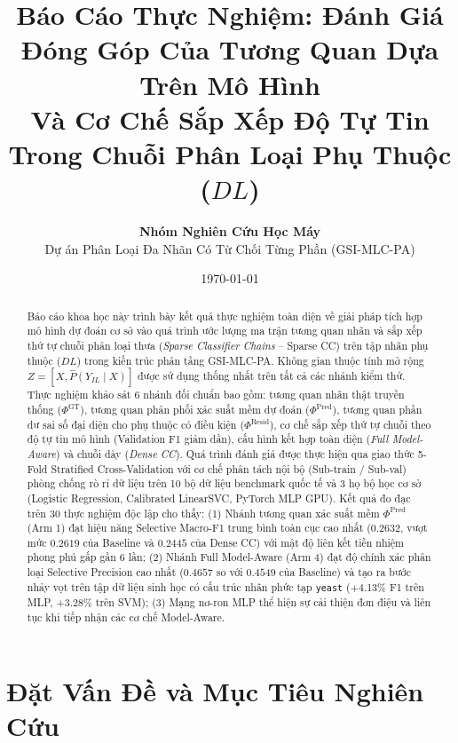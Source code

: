 \documentclass[11pt,a4paper]{article}
\begin{document}
\title{\textbf{\Large Báo Cáo Thực Nghiệm: Đánh Giá Đóng Góp Của Tương Quan Dựa Trên Mô Hình\\ Và Cơ Chế Sắp Xếp Độ Tự Tin Trong Chuỗi Phân Loại Phụ Thuộc ($DL$)}}
\author{\textbf{Nhóm Nghiên Cứu Học Máy} \\ Dự án Phân Loại Đa Nhãn Có Từ Chối Từng Phần (GSI-MLC-PA)}
\date{\today}
\maketitle

\begin{abstract}
Báo cáo khoa học này trình bày kết quả thực nghiệm toàn diện về giải pháp tích hợp mô hình dự đoán cơ sở vào quá trình ước lượng ma trận tương quan nhãn và sắp xếp thứ tự chuỗi phân loại thưa (\textit{Sparse Classifier Chains} -- Sparse CC) trên tập nhãn phụ thuộc ($DL$) trong kiến trúc phân tầng GSI-MLC-PA. Không gian thuộc tính mở rộng $Z = [X, \hat{P}(Y_{IL} \mid X)]$ được sử dụng thống nhất trên tất cả các nhánh kiểm thử. Thực nghiệm khảo sát 6 nhánh đối chuẩn bao gồm: tương quan nhãn thật truyền thống ($\Phi^{\text{GT}}$), tương quan phân phối xác suất mềm dự đoán ($\Phi^{\text{Pred}}$), tương quan phần dư sai số đại diện cho phụ thuộc có điều kiện ($\Phi^{\text{Resid}}$), cơ chế sắp xếp thứ tự chuỗi theo độ tự tin mô hình (Validation F1 giảm dần), cấu hình kết hợp toàn diện (\textit{Full Model-Aware}) và chuỗi dày (\textit{Dense CC}). Quá trình đánh giá được thực hiện qua giao thức 5-Fold Stratified Cross-Validation với cơ chế phân tách nội bộ (Sub-train / Sub-val) phòng chống rò rỉ dữ liệu trên 10 bộ dữ liệu benchmark quốc tế và 3 họ bộ học cơ sở (Logistic Regression, Calibrated LinearSVC, PyTorch MLP GPU). Kết quả đo đạc trên 30 thực nghiệm độc lập cho thấy: (1) Nhánh tương quan xác suất mềm $\Phi^{\text{Pred}}$ (Arm 1) đạt hiệu năng Selective Macro-F1 trung bình toàn cục cao nhất ($0.2632$, vượt mức $0.2619$ của Baseline và $0.2445$ của Dense CC) với mật độ liên kết tiền nhiệm phong phú gấp gần 6 lần; (2) Nhánh Full Model-Aware (Arm 4) đạt độ chính xác phân loại Selective Precision cao nhất ($0.4657$ so với $0.4549$ của Baseline) và tạo ra bước nhảy vọt trên tập dữ liệu sinh học có cấu trúc nhãn phức tạp \texttt{yeast} (+4.13\% F1 trên MLP, +3.28\% trên SVM); (3) Mạng nơ-ron MLP thể hiện sự cải thiện đơn điệu và liên tục khi tiếp nhận các cơ chế Model-Aware.
\end{abstract}

\section{Đặt Vấn Đề và Mục Tiêu Nghiên Cứu}
\end{document}
